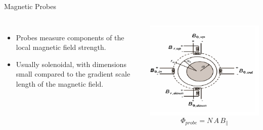 \documentclass{beamer}
\begin{document}
\begin{frame}{Magnetic Probes} %
\begin{columns}
     	\begin{itemize}
		\item Probes measure components of the local magnetic field strength.
		\item Usually solenoidal, with dimensions small compared to the gradient scale length of the magnetic field.
	\end{itemize}
	\begin{center}
	\includegraphics[width=.6\columnwidth]{magProbes.png}
	$$\Phi_{probe} = N\, A\, B_{\parallel}$$
	\end{center}

\end{columns}
\end{frame}
\end{document}
